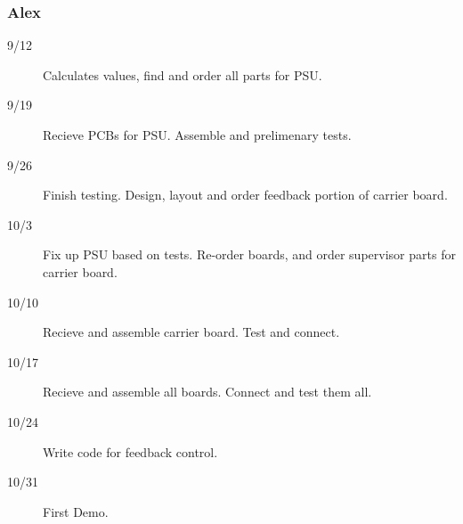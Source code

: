 \documentclass[12pt]{article}
\begin{document}
 \subsubsection{Alex}
 \begin{description}
  \item[9/12] Calculates values, find and order all parts for PSU.
  \item[9/19] Recieve PCBs for PSU. Assemble and prelimenary tests.
  \item[9/26] Finish testing.  Design, layout and order feedback portion of carrier board.
  \item[10/3] Fix up PSU based on tests. Re-order boards, and order supervisor parts for carrier board.
  \item[10/10] Recieve and assemble carrier board. Test and connect.
  \item[10/17] Recieve and assemble all boards. Connect and test them all.
  \item[10/24] Write code for feedback control.
  \item[10/31] First Demo.
\end{description}
 
\end{document}
